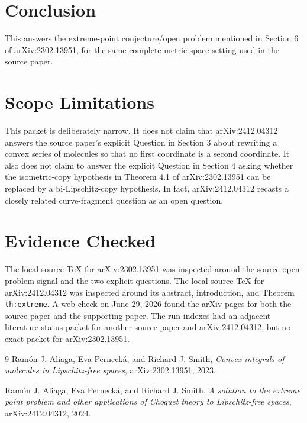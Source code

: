 \documentclass[11pt]{article}
\begin{document}
\section*{Conclusion}

This answers the extreme-point conjecture/open problem mentioned in Section 6
of arXiv:2302.13951, for the same complete-metric-space setting used in the
source paper.

\section*{Scope Limitations}

This packet is deliberately narrow.  It does not claim that arXiv:2412.04312
answers the source paper's explicit Question in Section 3 about rewriting a
convex series of molecules so that no first coordinate is a second coordinate.
It also does not claim to answer the explicit Question in Section 4 asking
whether the isometric-copy hypothesis in Theorem 4.1 of arXiv:2302.13951 can
be replaced by a bi-Lipschitz-copy hypothesis.  In fact, arXiv:2412.04312
recasts a closely related curve-fragment question as an open question.

\section*{Evidence Checked}

The local source TeX for arXiv:2302.13951 was inspected around the source
open-problem signal and the two explicit questions.  The local source TeX for
arXiv:2412.04312 was inspected around its abstract, introduction, and Theorem
\texttt{th:extreme}.  A web check on June 29, 2026 found the arXiv pages for
both the source paper and the supporting paper.  The run indexes had an
adjacent literature-status packet for another source paper and arXiv:2412.04312,
but no exact packet for arXiv:2302.13951.

\begin{thebibliography}{9}
Ram\'on J. Aliaga, Eva Perneck\'a, and Richard J. Smith,
\emph{Convex integrals of molecules in Lipschitz-free spaces},
arXiv:2302.13951, 2023.

Ram\'on J. Aliaga, Eva Perneck\'a, and Richard J. Smith,
\emph{A solution to the extreme point problem and other applications of
Choquet theory to Lipschitz-free spaces},
arXiv:2412.04312, 2024.
\end{thebibliography}
\end{document}
